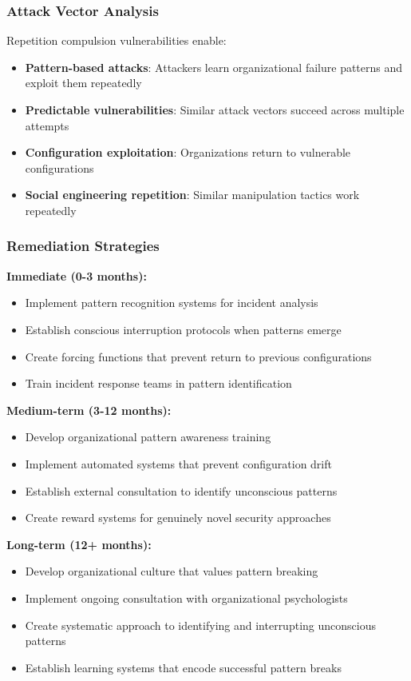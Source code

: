 \documentclass[11pt,a4paper]{article}
\begin{document}
\subsubsection{Attack Vector Analysis}

Repetition compulsion vulnerabilities enable:

\begin{itemize}
\item \textbf{Pattern-based attacks}: Attackers learn organizational failure patterns and exploit them repeatedly
\item \textbf{Predictable vulnerabilities}: Similar attack vectors succeed across multiple attempts
\item \textbf{Configuration exploitation}: Organizations return to vulnerable configurations
\item \textbf{Social engineering repetition}: Similar manipulation tactics work repeatedly
\end{itemize}

\subsubsection{Remediation Strategies}

\textbf{Immediate (0-3 months):}
\begin{itemize}
\item Implement pattern recognition systems for incident analysis
\item Establish conscious interruption protocols when patterns emerge
\item Create forcing functions that prevent return to previous configurations
\item Train incident response teams in pattern identification
\end{itemize}

\textbf{Medium-term (3-12 months):}
\begin{itemize}
\item Develop organizational pattern awareness training
\item Implement automated systems that prevent configuration drift
\item Establish external consultation to identify unconscious patterns
\item Create reward systems for genuinely novel security approaches
\end{itemize}

\textbf{Long-term (12+ months):}
\begin{itemize}
\item Develop organizational culture that values pattern breaking
\item Implement ongoing consultation with organizational psychologists
\item Create systematic approach to identifying and interrupting unconscious patterns
\item Establish learning systems that encode successful pattern breaks
\end{itemize}
\end{document}
